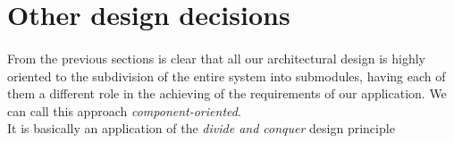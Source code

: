 \section{Other design decisions}
\paragraph{}From the previous sections is clear that all our architectural design is highly oriented to the subdivision of the entire system into submodules, having each of them a different role in the achieving of the requirements of our application. We can call this approach \textit{component-oriented}.\\
It is basically an application of the \textit{divide and conquer} design principle
